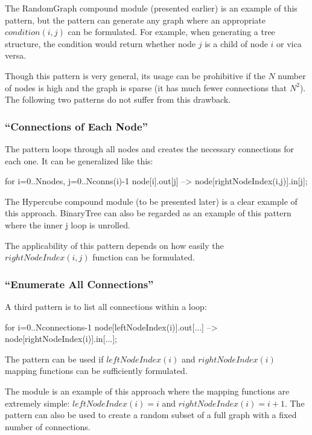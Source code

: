 The RandomGraph compound module (presented earlier) is an example of
this pattern, but the pattern can generate any graph where an
appropriate $condition(i,j)$ can be formulated. For example,
when generating a tree structure, the condition
would return whether node $j$ is a child of node $i$ or
vica versa.

Though this pattern is very general, its usage can be prohibitive if
the $N$ number of nodes is high and the graph is sparse (it has
much fewer connections that $N^2$). The following
two patterns do not suffer from this drawback.


\subsubsection{``Connections of Each Node''}

The pattern loops through all nodes and creates the necessary
connections for each one. It can be generalized like this:

\begin{ned}
for i=0..Nnodes, j=0..Nconns(i)-1 {
    node[i].out[j] --> node[rightNodeIndex(i,j)].in[j];
}
\end{ned}

The Hypercube compound module (to be
presented later) is a clear example of this approach. BinaryTree can
also be regarded as an example of this pattern where the inner j loop
is unrolled.

The applicability of this pattern depends on how easily the $rightNodeIndex(i,j)$
function can be formulated.


\subsubsection{``Enumerate All Connections''}


A third pattern is to list all connections within a loop:

\begin{ned}
for i=0..Nconnections-1 {
    node[leftNodeIndex(i)].out[...] --> node[rightNodeIndex(i)].in[...];
}
\end{ned}

The pattern can be used if $leftNodeIndex(i)$ and $rightNodeIndex(i)$
mapping functions can be sufficiently formulated.

The  module is an example of this approach where the mapping
functions are extremely simple: $leftNodeIndex(i)=i$ and $rightNodeIndex(i) = i+1$.
The pattern can also be used to create a random subset of a full
graph with a fixed number of connections.

